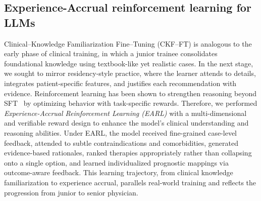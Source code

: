 \documentclass{article}
\begin{document}




\subsection{Experience-Accrual reinforcement learning for LLMs}
Clinical–Knowledge Familiarization Fine–Tuning (CKF–FT) is analogous to the early phase of clinical training, in which a junior trainee consolidates foundational knowledge using textbook-like yet realistic cases. In the next stage, we sought to mirror residency-style practice, where the learner attends to details, integrates patient-specific features, and justifies each recommendation with evidence. Reinforcement learning has been shown to strengthen reasoning beyond SFT~\cite{luowizardmath,shao_deepseekmath_2024,chen2025bridging,ouyang2022training} by optimizing behavior with task-specific rewards. Therefore, we performed \emph{Experience-Accrual Reinforcement Learning (EARL)} with a multi-dimensional and verifiable reward design to enhance the model's clinical understanding and reasoning abilities. Under EARL, the model received fine-grained case-level feedback, attended to subtle contraindications and comorbidities, generated evidence-based rationales, ranked therapies appropriately rather than collapsing onto a single option, and learned individualized prognostic mappings via outcome-aware feedback. This learning trajectory, from clinical knowledge familiarization to experience accrual, parallels real-world training and reflects the progression from junior to senior physician.
\end{document}
